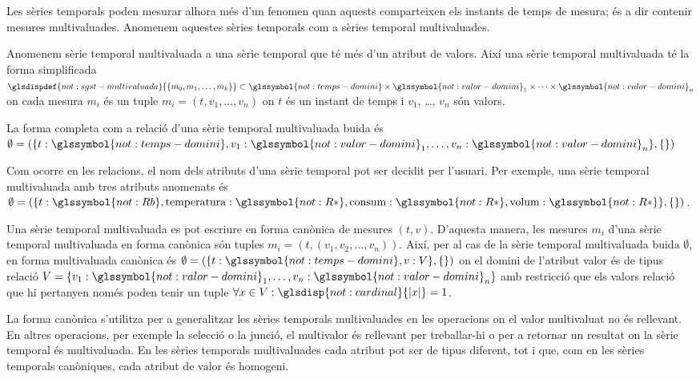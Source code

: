 Les sèries temporals poden mesurar alhora més d'un fenomen quan
aquests comparteixen els instants de temps de mesura; és a dir
contenir mesures multivaluades.  Anomenem aquestes sèries temporals
com a sèries temporal multivaluades.
\begin{definition}
  Anomenem sèrie temporal multivaluada a una sèrie temporal que té més
  d'un atribut de valors. Així una sèrie temporal multivaluada té la
  forma simplificada $\glsdispdef{not:sgst-multivaluada}{\{ m_0,
    m_1 , \dotsc, m_k \}}\subset \glssymbol{not:temps-domini} \times
  \glssymbol{not:valor-domini}_1 \times \dotsb \times
  \glssymbol{not:valor-domini}_n$ on cada mesura $m_i$ és un tuple
  $m_i=(t,v_1,\dotsc,v_n)$ on $t$ és un instant de temps i $v_1$,
  \dots, $v_n$ són valors.

  La forma completa com a relació d'una sèrie temporal multivaluada
  buida és $\emptyset = ( \{t: \glssymbol{not:temps-domini}, v_1:
  \glssymbol{not:valor-domini}_1 , \dotsc, v_n:
  \glssymbol{not:valor-domini}_n\}, \{ \} )$
\end{definition}

Com ocorre en les relacions, el nom dels atributs d'una sèrie temporal
pot ser decidit per l'usuari. Per exemple, una sèrie temporal
multivaluada amb tres atributs anomenats és $\emptyset = ( \{t:
\glssymbol{not:Rb}, \text{temperatura}: \glssymbol{not:R*}, \text{consum}:
\glssymbol{not:R*}, \text{volum}: \glssymbol{not:R*}\}, \{ \} )$.



Una sèrie temporal multivaluada es pot escriure en forma canònica de
mesures $(t,v)$. D'aquesta manera, les mesures $m_i$ d'una sèrie
temporal multivaluada en forma canònica són tuples
$m_i=(t,(v_1,v_2,\dotsc,v_n))$.  Així, per al cas de la sèrie temporal
multivaluada buida $\emptyset$, en forma multivaluada canònica és
$\emptyset = ( \{t: \glssymbol{not:temps-domini}, v: V \}, \{ \} )$ on
el domini de l'atribut valor és de tipus relació $V = \{ v_1:
\glssymbol{not:valor-domini}_1 , \dotsc, v_n:
\glssymbol{not:valor-domini}_n\}$ amb restricció que els valors
relació que hi pertanyen només poden tenir un tuple $\forall x \in V:
\glsdisp{not:cardinal}{|x|} = 1$.


La forma canònica s'utilitza per a generalitzar les sèries temporals
multivaluades en les operacions on el valor multivaluat no és
rellevant. En altres operacions, per exemple la selecció o la junció,
el multivalor és rellevant per treballar-hi o per a retornar un
resultat on la sèrie temporal és multivaluada. En les sèries temporals
multivaluades cada atribut pot ser de tipus diferent, tot i que, com
en les sèries temporals canòniques, cada atribut de valor és homogeni.


